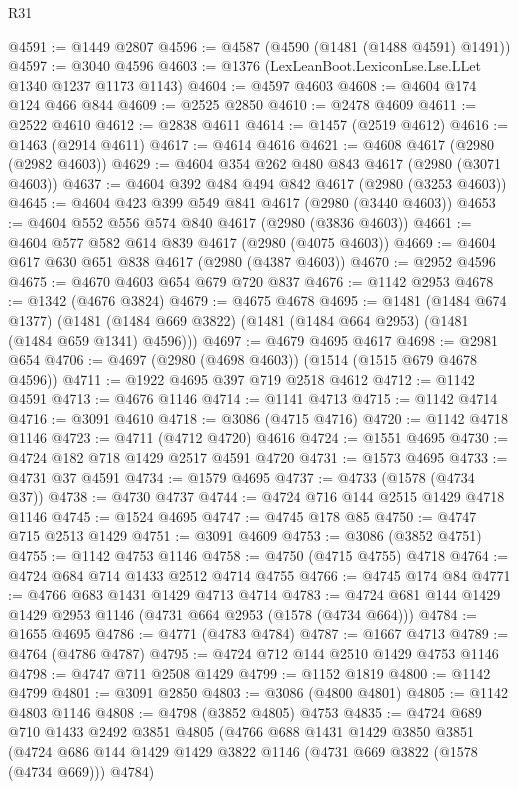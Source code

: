 \begin{lexlean}{R31}
\begin{coremodule}
@4591 := @1449 @2807
@4596 := @4587 (@4590 (@1481 (@1488 @4591) @1491))
@4597 := @3040 @4596
@4603 := @1376 (LexLeanBoot.LexiconLse.Lse.LLet @1340 @1237 @1173 @1143)
@4604 := @4597 @4603
@4608 := @4604 @174 @124 @466 @844
@4609 := @2525 @2850
@4610 := @2478 @4609
@4611 := @2522 @4610
@4612 := @2838 @4611
@4614 := @1457 (@2519 @4612)
@4616 := @1463 (@2914 @4611)
@4617 := @4614 @4616
@4621 := @4608 @4617 (@2980 (@2982 @4603))
@4629 := @4604 @354 @262 @480 @843 @4617 (@2980 (@3071 @4603))
@4637 := @4604 @392 @484 @494 @842 @4617 (@2980 (@3253 @4603))
@4645 := @4604 @423 @399 @549 @841 @4617 (@2980 (@3440 @4603))
@4653 := @4604 @552 @556 @574 @840 @4617 (@2980 (@3836 @4603))
@4661 := @4604 @577 @582 @614 @839 @4617 (@2980 (@4075 @4603))
@4669 := @4604 @617 @630 @651 @838 @4617 (@2980 (@4387 @4603))
@4670 := @2952 @4596
@4675 := @4670 @4603 @654 @679 @720 @837
@4676 := @1142 @2953
@4678 := @1342 (@4676 @3824)
@4679 := @4675 @4678
@4695 := @1481
    (@1484 @674 @1377)
    (@1481 (@1484 @669 @3822) (@1481 (@1484 @664 @2953) (@1481 (@1484 @659 @1341) @4596)))
@4697 := @4679 @4695 @4617
@4698 := @2981 @654
@4706 := @4697 (@2980 (@4698 @4603)) (@1514 (@1515 @679 @4678 @4596))
@4711 := @1922 @4695 @397 @719 @2518 @4612
@4712 := @1142 @4591
@4713 := @4676 @1146
@4714 := @1141 @4713
@4715 := @1142 @4714
@4716 := @3091 @4610
@4718 := @3086 (@4715 @4716)
@4720 := @1142 @4718 @1146
@4723 := @4711 (@4712 @4720) @4616
@4724 := @1551 @4695
@4730 := @4724 @182 @718 @1429 @2517 @4591 @4720
@4731 := @1573 @4695
@4733 := @4731 @37 @4591
@4734 := @1579 @4695
@4737 := @4733 (@1578 (@4734 @37))
@4738 := @4730 @4737
@4744 := @4724 @716 @144 @2515 @1429 @4718 @1146
@4745 := @1524 @4695
@4747 := @4745 @178 @85
@4750 := @4747 @715 @2513 @1429
@4751 := @3091 @4609
@4753 := @3086 (@3852 @4751)
@4755 := @1142 @4753 @1146
@4758 := @4750 (@4715 @4755) @4718
@4764 := @4724 @684 @714 @1433 @2512 @4714 @4755
@4766 := @4745 @174 @84
@4771 := @4766 @683 @1431 @1429 @4713 @4714
@4783 := @4724 @681 @144 @1429 @1429 @2953 @1146 (@4731 @664 @2953 (@1578 (@4734 @664)))
@4784 := @1655 @4695
@4786 := @4771 (@4783 @4784)
@4787 := @1667 @4713
@4789 := @4764 (@4786 @4787)
@4795 := @4724 @712 @144 @2510 @1429 @4753 @1146
@4798 := @4747 @711 @2508 @1429
@4799 := @1152 @1819
@4800 := @1142 @4799
@4801 := @3091 @2850
@4803 := @3086 (@4800 @4801)
@4805 := @1142 @4803 @1146
@4808 := @4798 (@3852 @4805) @4753
@4835 := @4724
    @689
    @710
    @1433
    @2492
    @3851
    @4805
    (@4766
      @688
      @1431
      @1429
      @3850
      @3851
      (@4724 @686 @144 @1429 @1429 @3822 @1146 (@4731 @669 @3822 (@1578 (@4734 @669))) @4784)

\end{coremodule}
\end{lexlean}
